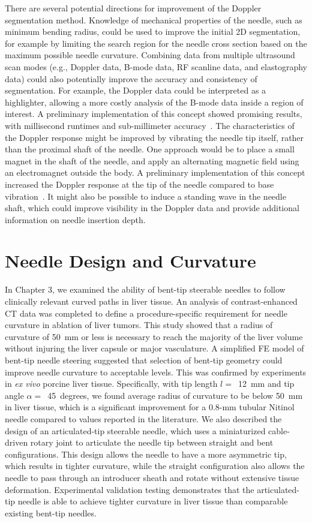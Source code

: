 There are several potential directions for improvement of the Doppler segmentation method. Knowledge of mechanical properties of the needle, such as minimum bending radius, could be used to improve the initial 2D segmentation, for example by limiting the search region for the needle cross section based on the maximum possible needle curvature. Combining data from multiple ultrasound scan modes (e.g., Doppler data, B-mode data, RF scanline data, and elastography data) could also potentially improve the accuracy and consistency of segmentation. For example, the Doppler data could be interpreted as a highlighter, allowing a more costly analysis of the B-mode data inside a region of interest. A preliminary implementation of this concept showed promising results, with millisecond runtimes and sub-millimeter accuracy~\cite{Greer2014}. The characteristics of the Doppler response might be improved by vibrating the needle tip itself, rather than the proximal shaft of the needle. One approach would be to place a small magnet in the shaft of the needle, and apply an alternating magnetic field using an electromagnet outside the body. A preliminary implementation of this concept increased the Doppler response at the tip of the needle compared to base vibration~\cite{Cabreros2014}. It might also be possible to induce a standing wave in the needle shaft, which could improve visibility in the Doppler data and provide additional information on needle insertion depth.

\section{Needle Design and Curvature}
In Chapter 3, we examined the ability of bent-tip steerable needles to follow clinically relevant curved paths in liver tissue. An analysis of contrast-enhanced CT data was completed to define a procedure-specific requirement for needle curvature in ablation of liver tumors. This study showed that a radius of curvature of 50~mm or less is necessary to reach the majority of the liver volume without injuring the liver capsule or major vasculature. A simplified FE model of bent-tip needle steering suggested that selection of bent-tip geometry could improve needle curvature to acceptable levels. This was confirmed by experiments in \textit{ex vivo} porcine liver tissue. Specifically, with tip length $l =$~12~mm and tip angle $\alpha =$~45~degrees, we found average radius of curvature to be below 50~mm in liver tissue, which is a significant improvement for a 0.8-mm tubular Nitinol needle compared to values reported in the literature. We also described the design of an articulated-tip steerable needle, which uses a miniaturized cable-driven rotary joint to articulate the needle tip between straight and bent configurations. This design allows the needle to have a more asymmetric tip, which results in tighter curvature, while the straight configuration also allows the needle to pass through an introducer sheath and rotate without extensive tissue deformation. Experimental validation testing demonstrates that the articulated-tip needle is able to achieve tighter curvature in liver tissue than comparable existing bent-tip needles. 

